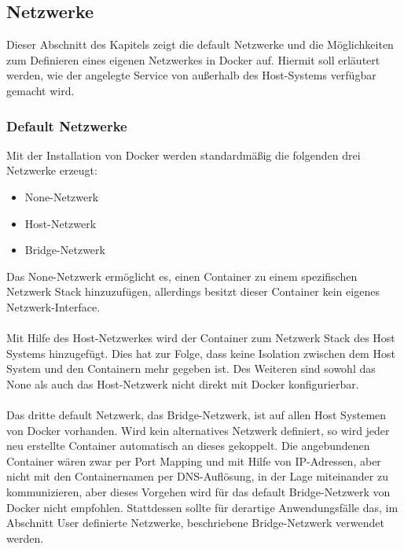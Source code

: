 \subsection{Netzwerke}
Dieser Abschnitt des Kapitels zeigt die default Netzwerke und die Möglichkeiten zum Definieren eines eigenen Netzwerkes in Docker auf. Hiermit soll erläutert werden, wie der angelegte Service von außerhalb des Host-Systems verfügbar gemacht wird.
\subsubsection{Default Netzwerke}
Mit der Installation von Docker werden standardmäßig die folgenden drei Netzwerke erzeugt:
\begin{itemize}
	\item None-Netzwerk
	\item Host-Netzwerk
	\item Bridge-Netzwerk
\end{itemize}
Das None-Netzwerk ermöglicht es, einen Container zu einem spezifischen Netzwerk Stack hinzuzufügen, allerdings besitzt dieser Container kein eigenes Netzwerk-Interface. 
\\\\
Mit Hilfe des Host-Netzwerkes wird der Container zum Netzwerk Stack des Host Systems hinzugefügt. Dies hat zur Folge, dass keine Isolation zwischen dem Host System und den Containern mehr gegeben ist. Des Weiteren sind sowohl das None als auch das Host-Netzwerk nicht direkt mit Docker konfigurierbar.
\\\\
Das dritte default Netzwerk, das Bridge-Netzwerk, ist auf allen Host Systemen von Docker vorhanden. Wird kein alternatives Netzwerk definiert, so wird jeder neu erstellte Container automatisch an dieses gekoppelt. Die angebundenen Container wären zwar per Port Mapping und mit Hilfe von IP-Adressen, aber nicht mit den Containernamen per DNS-Auflösung, in der Lage miteinander zu kommunizieren, aber dieses Vorgehen wird für das default Bridge-Netzwerk von Docker nicht empfohlen. Stattdessen sollte für derartige Anwendungsfälle das, im Abschnitt User definierte Netzwerke, beschriebene Bridge-Netzwerk verwendet werden.
